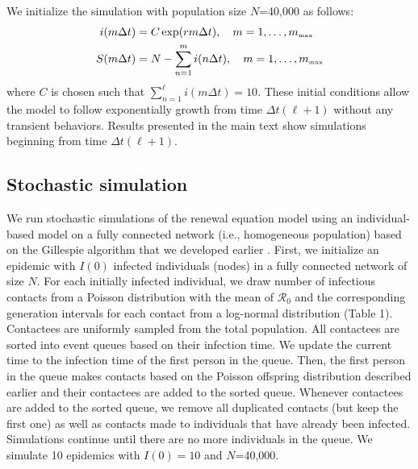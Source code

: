 \documentclass[12pt]{article}
\newcommand{\Rx}[1]{\ensuremath{{\mathcal R}_{#1}}\xspace}
\newcommand{\Ro}{\Rx{0}}
\newcommand{\tsub}[2]{#1_{{\textrm{\tiny #2}}}}
\providecommand{\DIFaddtex}[1]{{\protect\color{blue}\uwave{#1}}} %
\providecommand{\DIFdeltex}[1]{{\protect\color{red}\sout{#1}}}                      %
\providecommand{\DIFaddbegin}{} %
\providecommand{\DIFaddend}{} %
\providecommand{\DIFdelbegin}{} %
\providecommand{\DIFdelend}{} %
\providecommand{\DIFadd}[1]{\texorpdfstring{\DIFaddtex{#1}}{#1}} %
\providecommand{\DIFdel}[1]{\texorpdfstring{\DIFdeltex{#1}}{}} %
\newcommand{\DIFscaledelfig}{0.5}
\newlength{\DIFdelgraphicswidth} %
\newlength{\DIFdelgraphicsheight} %
\newcommand{\DIFaddincludegraphics}[2][]{{\color{blue}\fbox{\DIFOincludegraphics[#1]{#2}}}} %
\newcommand{\DIFdelincludegraphics}[2][]{%
\sbox{\DIFdelgraphicsbox}{\DIFOincludegraphics[#1]{#2}}%
\settoboxwidth{\DIFdelgraphicswidth}{\DIFdelgraphicsbox} %
\settoboxtotalheight{\DIFdelgraphicsheight}{\DIFdelgraphicsbox} %
\scalebox{\DIFscaledelfig}{%
\parbox[b]{\DIFdelgraphicswidth}{\usebox{\DIFdelgraphicsbox}\\[-\baselineskip] \rule{\DIFdelgraphicswidth}{0em}}\llap{\resizebox{\DIFdelgraphicswidth}{\DIFdelgraphicsheight}{%
\setlength{\unitlength}{\DIFdelgraphicswidth}%
\begin{picture}(1,1)%
\thicklines\linethickness{2pt} %
{\color[rgb]{1,0,0}\put(0,0){\framebox(1,1){}}}%
{\color[rgb]{1,0,0}\put(0,0){\line( 1,1){1}}}%
{\color[rgb]{1,0,0}\put(0,1){\line(1,-1){1}}}%
\end{picture}%
}\hspace*{3pt}}} %
} %
\DeclareRobustCommand{\DIFaddbegin}{\DIFOaddbegin \let\includegraphics\DIFaddincludegraphics} %
\DeclareRobustCommand{\DIFaddend}{\DIFOaddend \let\includegraphics\DIFOincludegraphics} %
\DeclareRobustCommand{\DIFdelbegin}{\DIFOdelbegin \let\includegraphics\DIFdelincludegraphics} %
\DeclareRobustCommand{\DIFdelend}{\DIFOaddend \let\includegraphics\DIFOincludegraphics} %
\begin{document}
We initialize the simulation with population size $N$=40,000 as follows:
\begin{equation}
\DIFdelbegin %
\DIFdelend \DIFaddbegin \begin{aligned}
i(m \Delta t) &= C \exp(r m \Delta t), \quad m=1, \dots, \tsub{m}{max}\\
S(m \Delta t) &= N - \sum_{n=1}^m i(n \Delta t), \quad m=1, \dots, \tsub{m}{max}\\
\end{aligned}\DIFaddend 
\end{equation}
where $C$ is chosen such that \DIFdelbegin \DIFdel{$\sum_{n=1}^\ell i(m \Delta t)=10$}\DIFdelend \DIFaddbegin \DIFadd{$\sum_{n=1}^{\tsub{m}{max}} i(m \Delta t)=10$}\DIFaddend .
These initial conditions allow the model to follow exponentially growth from time \DIFdelbegin \DIFdel{$\Delta t (\ell + 1)$ }\DIFdelend \DIFaddbegin \DIFadd{$\Delta t (\tsub{m}{max} + 1)$ }\DIFaddend without any transient behaviors.
Results presented in the main text show simulations beginning from time \DIFdelbegin \DIFdel{$\Delta t (\ell + 1)$}\DIFdelend \DIFaddbegin \DIFadd{$\Delta t (\tsub{m}{max} + 1)$}\DIFaddend .

\subsection{Stochastic simulation}

We run stochastic simulations of the renewal equation model using an individual-based model on a fully connected network (i.e., homogeneous population) based on the Gillespie algorithm that we developed earlier \citep{park2019inferring}.
First, we initialize an epidemic with $I(0)$ infected individuals (nodes) in a fully connected network of size $N$. 
For each initially infected individual, we draw number of infectious contacts from a Poisson distribution with the mean of \Ro and the corresponding generation intervals for each contact from a log-normal distribution (Table 1).
Contactees are uniformly sampled from the total population.
All contactees are sorted into event queues based on their infection time.
We update the current time to the infection time of the first person in the queue.
Then, the first person in the queue makes contacts based on the Poisson offspring distribution described earlier and their contactees are added to the sorted queue.
Whenever contactees are added to the sorted queue, we remove all duplicated contacts (but keep the first one) as well as contacts made to individuals that have already been infected.
Simulations continue until there are no more individuals in the queue.
We simulate 10 epidemics with $I(0)=10$ and $N$=40,000.
\end{document}
